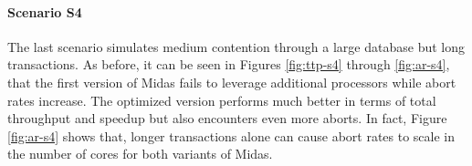 
\paragraph{Scenario S4}

The last scenario simulates medium contention through a large database but long
transactions. As before, it can be seen in Figures \ref{fig:ttp-s4} through
\ref{fig:ar-s4}, that the first version of Midas fails to leverage additional
processors while abort rates increase. The optimized version performs much
better in terms of total throughput and speedup but also encounters even more
aborts. In fact, Figure \ref{fig:ar-s4} shows that, longer transactions alone
can cause abort rates to scale in the number of cores for both variants of
Midas.

